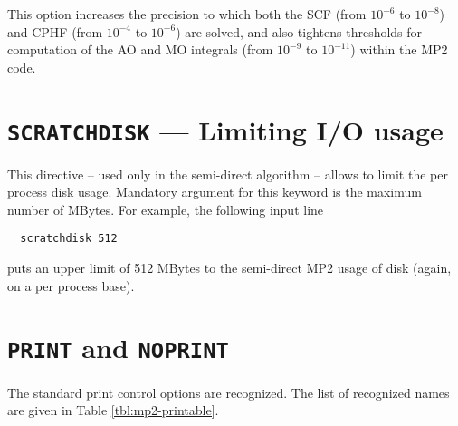  This option increases the precision to which both the SCF (from
$10^{-6}$ to $10^{-8}$) and CPHF (from $10^{-4}$ to $10^{-6}$) are
solved, and also tightens thresholds for computation of the AO and MO
integrals (from $10^{-9}$ to $10^{-11}$) within the MP2 code.

\section{{\tt SCRATCHDISK} --- Limiting I/O usage}

This directive -- used only in the semi-direct algorithm -- allows to
limit the per process disk usage. Mandatory argument for this keyword
is the maximum number of MBytes.
For example, the following input line
\begin{verbatim}
  scratchdisk 512
\end{verbatim}
puts an upper limit of 512 MBytes to the semi-direct MP2 usage of disk
(again, on a per process base).

\section{{\tt PRINT} and {\tt NOPRINT}}

The standard print control options are recognized.  The list of
recognized names are given in Table \ref{tbl:mp2-printable}.

